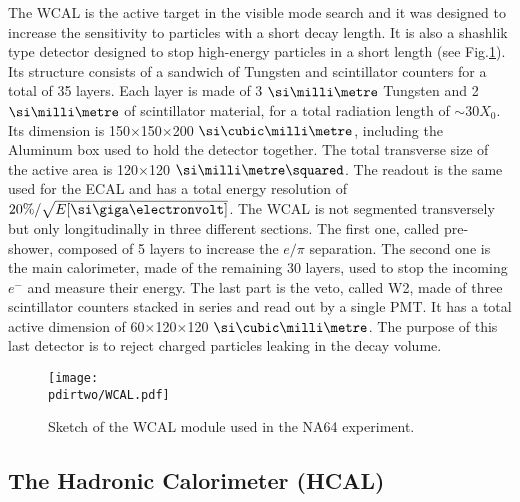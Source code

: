 The WCAL is the active target in the visible mode search and it was designed to increase the sensitivity to particles with a short decay length. It is also a shashlik type detector designed to stop high-energy particles in a short length (see Fig.\ref{fig:wcal-sketch}). Its structure consists of a sandwich of Tungsten and scintillator counters for a total of 35 layers. Each layer is made of 3 $\mmi$ Tungsten and 2 $\mmi$ of scintillator material, for a total radiation length of $\sim$30$X_0$. Its dimension is 150$\times$150$\times$200 $\mmc$, including the Aluminum box used to hold the detector together. The total transverse size of the active area is 120$\times$120 $\mms$. The readout is the same used for the ECAL and has a total energy resolution of $20\%/ \sqrt{E[\gev]}$. The WCAL is not segmented transversely but only longitudinally in three different sections. The first one, called pre-shower, composed of 5 layers to increase the $e/\pi$ separation. The second one is the main calorimeter, made of the remaining 30 layers, used to stop the incoming $e^-$ and measure their energy. The last part is the veto, called W2, made of three scintillator counters stacked in series and read out by a single PMT. It has a total active dimension of 60$\times$120$\times$120 $\mmc$. The purpose of this last detector is to reject charged particles leaking in the decay volume. 

\begin{figure}[bth!]
\centering
\texttt{[image: \\pdirtwo/WCAL.pdf]}
\caption[WCAL sketch]{Sketch of the WCAL module used in the NA64 experiment.}
\label{fig:wcal-sketch}
\end{figure}


\subsection{The Hadronic Calorimeter (HCAL)}
\label{ch2:sec:detectors-hcal}

